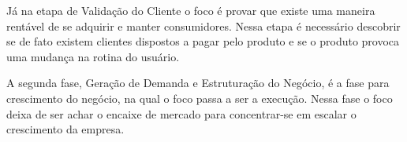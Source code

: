 \par Já na etapa de Validação do Cliente o foco é provar que existe uma maneira rentável de se adquirir e manter consumidores. Nessa etapa é necessário descobrir se de fato existem clientes dispostos a pagar pelo produto e se o produto provoca uma mudança na rotina do usuário.
\par A segunda fase, Geração de Demanda e Estruturação do Negócio, é a fase para crescimento do negócio, na qual o foco passa a ser a execução. Nessa fase o foco deixa de ser achar o encaixe de mercado para concentrar-se em escalar o crescimento da empresa.
